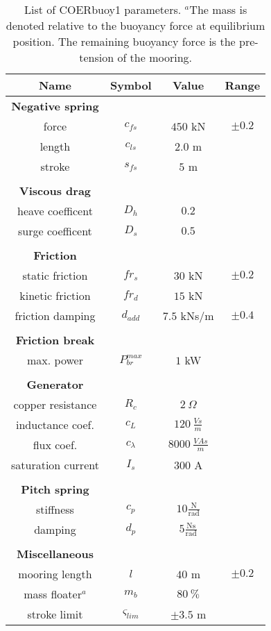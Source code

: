 \documentclass[oneside,10pt,a4paper]{book}
\begin{document}
\begin{table}[!t]
	\centering
		\begin{tabular}{c c c c}
			\hline
			Name & Symbol & Value & Range \\
			\hline
			\textbf{Negative spring}&&&\\
			force&$c_{fs}$&$450$ kN&$\pm0.2$\\
			length&$c_{ls}$&$2.0$ m&\\
			stroke&$s_{fs}$&$5$ m&\\
			&&&\\
			\textbf{Viscous drag}&&&\\
			heave coefficent&$D_{h}$&$0.2$&\\
			surge coefficent&$D_{s}$&$0.5$&\\
			&&&\\
			\textbf{Friction}&&&\\
			static friction&$fr_s$&$30$ kN&$\pm0.2$\\
			kinetic friction&$fr_d$&$15$ kN&\\
			friction damping&$d_{add}$&$7.5$ kNs/m&$\pm0.4$\\
			&&&\\
			\textbf{Friction break}&&&\\
			max. power&$P_{br}^{max}$&$1$ kW&\\
			&&&\\
			\textbf{Generator}&&&\\
			copper resistance&$R_c$&$2\:\Omega$&\\
			inductance coef.&$c_L$&$120\:\frac{Vs}{m}$&\\
			flux coef.&$c_\lambda$&$8000\:\frac{VAs}{m}$&\\
			saturation current&$I_{s}$&$300$ A&\\
			&&&\\
			\textbf{Pitch spring}&&&\\
			stiffness&$c_p$&$10\frac{\text{N}}{\text{rad}}$&\\
			damping&$d_p$&$5\frac{\text{Ns}}{\text{rad}}$&\\
			&&&\\
			\textbf{Miscellaneous}&&&\\
			mooring length&$l$&$40$ m&$\pm0.2$\\
			mass floater$^a$&$m_b$&$80\:\%$&\\
			stroke limit&$\varsigma_{lim}$&$\pm3.5$ m&\\
			
			\hline
		\end{tabular}
		\label{tab:parameters}
		\caption{List of COERbuoy1 parameters. $^a$The mass is denoted relative to the buoyancy force at
			equilibrium position. The remaining buoyancy force is
			the pre-tension of the mooring.}
\end{table}
\end{document}
